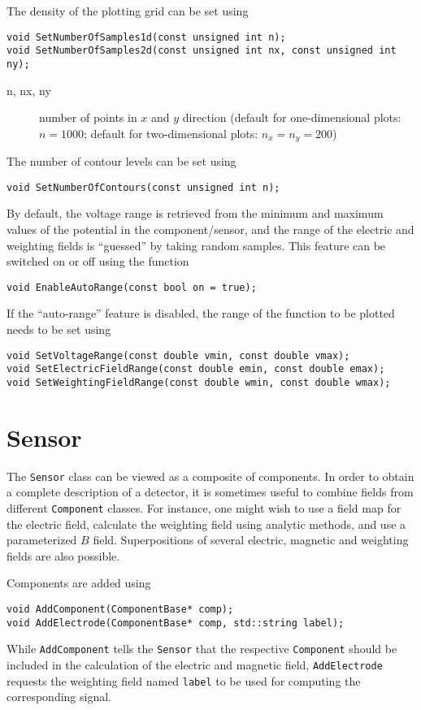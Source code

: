 The density of the plotting grid can be set using
\begin{lstlisting}
void SetNumberOfSamples1d(const unsigned int n);
void SetNumberOfSamples2d(const unsigned int nx, const unsigned int ny);
\end{lstlisting}
\begin{description}
  \item[n, nx, ny]
  number of points in \(x\) and \(y\) direction 
  (default for one-dimensional plots: \(n = 1000\);
   default for two-dimensional plots: \(n_{x} = n_{y} = 200\)) 
\end{description}

The number of contour levels can be set using
\begin{lstlisting}
void SetNumberOfContours(const unsigned int n);
\end{lstlisting}

By default, the voltage range is retrieved from the 
minimum and maximum values of the 
potential in the component/sensor, and
the range of the electric and weighting fields is
``guessed'' by taking random samples.
This feature can be switched on or off using the function
\begin{lstlisting}
void EnableAutoRange(const bool on = true);
\end{lstlisting}

If the ``auto-range'' feature is disabled,
the range of the function to be plotted needs to be set using
\begin{lstlisting}
void SetVoltageRange(const double vmin, const double vmax);
void SetElectricFieldRange(const double emin, const double emax);
void SetWeightingFieldRange(const double wmin, const double wmax);
\end{lstlisting}

\section{Sensor}

The \texttt{Sensor} class can be viewed as a composite of components. 
In order to obtain a complete description of a detector, 
it is sometimes useful to combine fields from different 
\texttt{Component} classes.
For instance, one might wish to use a field map for the electric field, 
calculate the weighting field using analytic methods, 
and use a parameterized \(B\) field. 
Superpositions of several electric, magnetic and weighting fields are also possible. 


Components are added using
\begin{lstlisting}
void AddComponent(ComponentBase* comp);
void AddElectrode(ComponentBase* comp, std::string label);
\end{lstlisting}
While \texttt{AddComponent} tells the \texttt{Sensor} that the 
respective \texttt{Component} should be included in the calculation 
of the electric and magnetic field, 
\texttt{AddElectrode} requests the weighting field named \texttt{label} 
to be used for computing the corresponding signal.

